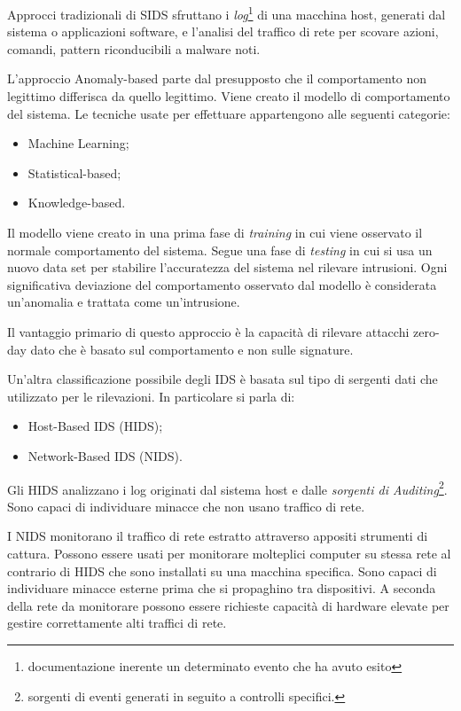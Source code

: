 Approcci tradizionali di SIDS sfruttano i \textit{log}\footnote{documentazione inerente un determinato evento che ha avuto esito} di una macchina host, generati dal sistema o applicazioni software, e l'analisi del traffico di rete per scovare azioni, comandi, pattern riconducibili a malware noti.


L'approccio Anomaly-based parte dal presupposto che il comportamento non legittimo differisca da quello legittimo.
Viene creato il modello di comportamento del sistema. Le tecniche usate per effettuare appartengono alle seguenti categorie:
\begin{itemize}
    \item Machine Learning;
    \item Statistical-based;
    \item Knowledge-based.
\end{itemize}
Il modello viene creato in una prima fase di \textit{training} in cui viene osservato il normale comportamento del sistema. Segue una fase di \textit{testing} in cui si usa un nuovo data set per stabilire l'accuratezza del sistema nel rilevare intrusioni. 
Ogni significativa deviazione del comportamento osservato dal modello è considerata un'anomalia e trattata come un'intrusione.

Il vantaggio primario di questo approccio è la capacità di rilevare attacchi zero-day dato che è basato sul comportamento e non sulle signature.


Un'altra classificazione possibile degli IDS è basata sul tipo di sergenti dati che utilizzato per le rilevazioni.  In particolare si parla di:
\begin{itemize}
    \item Host-Based IDS (HIDS);
    \item Network-Based IDS (NIDS).
\end{itemize}

Gli HIDS analizzano i log originati dal sistema host e dalle \textit{sorgenti di Auditing}\footnote{sorgenti di eventi generati in seguito a controlli specifici.}. Sono capaci di individuare minacce che non usano traffico di rete.

I NIDS monitorano il traffico di rete estratto attraverso appositi strumenti di cattura. Possono essere usati per monitorare molteplici computer su stessa rete al contrario di HIDS che sono installati su una macchina specifica. Sono capaci di individuare minacce esterne prima che si propaghino tra dispositivi. A seconda della rete da monitorare possono essere richieste capacità di hardware elevate per gestire correttamente alti traffici di rete.


